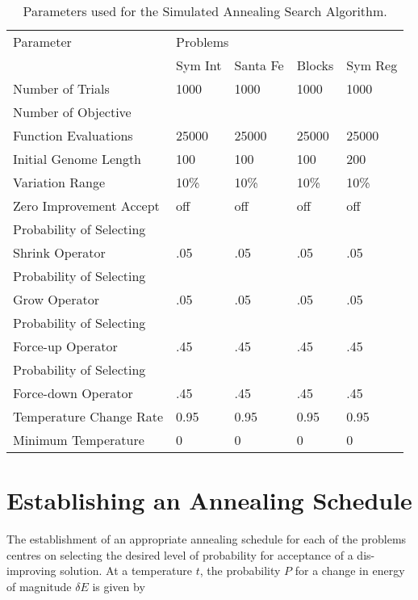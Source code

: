 \begin{table}[!hbp]
\begin{center}
\begin{tabular}{|l|l|l|l|l|}
\hline
Parameter &\multicolumn{4}{l|}{Problems}\\
\cline{2-1} \cline{3-1} \cline{4-1} \cline{5-1} 
 & Sym Int & Santa Fe & Blocks & Sym Reg  \\
\hline
Number of Trials & 1000 & 1000 & 1000 & 1000  \\
Number of Objective & & & & \\ 
Function Evaluations  & 25000 & 25000 & 25000 & 25000 \\
Initial Genome Length & 100 & 100 & 100 & 200  \\
Variation Range  & 10\% & 10\% & 10\% & 10\%  \\
Zero Improvement Accept  & off & off & off & off  \\
Probability of Selecting & & & & \\
Shrink Operator  & .05 & .05 & .05 & .05  \\
Probability of Selecting & & & & \\
Grow Operator  & .05 & .05 & .05 & .05  \\
Probability of Selecting & & & & \\
Force-up Operator  & .45 & .45 & .45 & .45  \\
Probability of Selecting & & & & \\
Force-down Operator  & .45 & .45 & .45 & .45 \\
Temperature Change Rate & 0.95 & 0.95 & 0.95 & 0.95  \\
Minimum Temperature & 0 & 0 & 0 & 0  \\
\hline
\end{tabular}
\caption{\label{sa_param_table} Parameters used for the Simulated Annealing Search Algorithm.}
\end{center}
\end{table}


\section{Establishing an Annealing Schedule}
\label{schedule_selection}The establishment of an appropriate annealing schedule for each of the problems centres on selecting the desired level of probability for acceptance of a dis-improving solution. 
At a temperature $t$, the probability $P$ for a change  in energy of magnitude $\delta E$ is given by 

